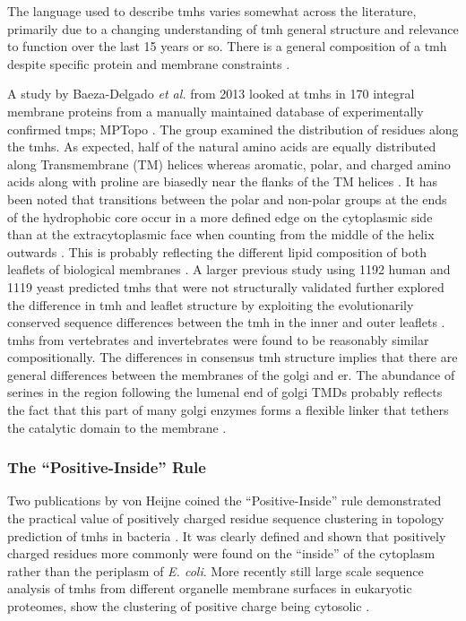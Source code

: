 The language used to describe \gls{tmh}s varies somewhat across the literature, primarily due to a changing understanding of \gls{tmh} general structure and relevance to function over the last 15 years or so. There is a general composition of a \gls{tmh} despite specific protein and membrane constraints \cite{Sharpe2010}.

A study by Baeza-Delgado {\it et al.} from 2013 \cite{Baeza-Delgado2013} looked at \gls{tmh}s in 170 integral membrane proteins from a manually maintained database of experimentally confirmed \gls{tmp}s; MPTopo \cite{Jayasinghe2001}. The group examined the distribution of residues along the \gls{tmh}s. As expected, half of the natural amino acids are equally distributed along Transmembrane (TM) helices whereas aromatic, polar, and charged amino acids along with proline are biasedly near the flanks of the TM helices \cite{Baeza-Delgado2013}. It has been noted that transitions between the polar and non-polar groups at the ends of the hydrophobic core occur in a more defined edge on the cytoplasmic side than at the extracytoplasmic face when counting from the middle of the helix outwards \cite{Baeza-Delgado2013}. This is probably reflecting the different lipid composition of both leaflets of biological membranes \cite{Baeza-Delgado2013}. A larger previous study using 1192 human and 1119 yeast predicted \gls{tmh}s that were not structurally validated further explored the difference in \gls{tmh} and leaflet structure by exploiting the evolutionarily conserved sequence differences between the \gls{tmh} in the inner and outer leaflets \cite{Sharpe2010}. \gls{tmh}s from vertebrates and invertebrates were found to be reasonably similar compositionally. The differences in consensus \gls{tmh} structure implies that there are general differences between the membranes of the golgi and \gls{er}. The abundance of serines in the region following the lumenal end of golgi TMDs probably reflects the fact that this part of many golgi enzymes forms a flexible linker that tethers the catalytic domain to the membrane \cite{Sharpe2010}.

\subsubsection{The ``Positive-Inside'' Rule}

Two publications by von Heijne coined the ``Positive-Inside'' rule demonstrated the practical value of positively charged residue sequence clustering in topology prediction of \gls{tmh}s in bacteria \cite{VonHeijne1989,VonHeijne1992}. It was clearly defined and shown that positively charged residues more commonly were found on the ``inside'' of the cytoplasm rather than the periplasm of {\it E. coli}. More recently still large scale sequence analysis of \gls{tmh}s from different organelle membrane surfaces in eukaryotic proteomes, show the clustering of positive charge being cytosolic \cite{Sharpe2010, Baeza-Delgado2013, Pogozheva2013}.

